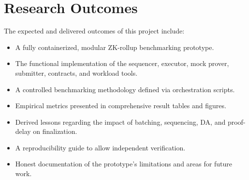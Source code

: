 \section{Research Outcomes}
\label{sec:research_outcomes}
The expected and delivered outcomes of this project include:
\begin{itemize}
    \item A fully containerized, modular ZK-rollup benchmarking prototype.
    \item The functional implementation of the sequencer, executor, mock prover, submitter, contracts, and workload tools.
    \item A controlled benchmarking methodology defined via orchestration scripts.
    \item Empirical metrics presented in comprehensive result tables and figures.
    \item Derived lessons regarding the impact of batching, sequencing, DA, and proof-delay on finalization.
    \item A reproducibility guide to allow independent verification.
    \item Honest documentation of the prototype's limitations and areas for future work.
\end{itemize}